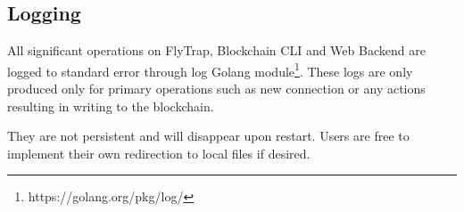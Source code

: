 \subsection{Logging}
All significant operations on FlyTrap, Blockchain CLI and Web Backend are logged to standard error through log Golang module\footnote{https://golang.org/pkg/log/}. These logs are only produced only for primary operations such as new connection or any actions resulting in writing to the blockchain.

They are not persistent and will disappear upon restart. Users are free to implement their own redirection to local files if desired.

